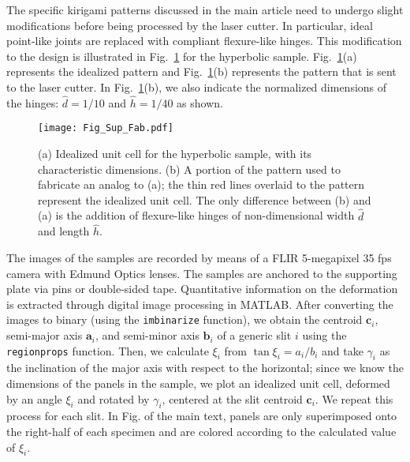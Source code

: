 \documentclass[aps,11pt,tightenlines,notitlepage,superscriptaddress,longbibliography,nofootinbib]{revtex4-1}
\begin{document}
The specific kirigami patterns discussed in the main article need to undergo slight modifications before being processed by the laser cutter. In particular, ideal point-like joints are replaced with compliant flexure-like hinges. This modification to the design is illustrated in Fig.~\ref{fig:Fab} for the hyperbolic sample. Fig.~\ref{fig:Fab}(a) represents the idealized pattern and Fig.~\ref{fig:Fab}(b) represents the pattern that is sent to the laser cutter.
In Fig.~\ref{fig:Fab}(b), we also indicate the normalized dimensions of the hinges: $\hat{d}=1/10$ and $\hat{h}=1/40$ as shown. %
%
\begin{figure}[h]
\centering
\texttt{[image: Fig\_Sup\_Fab.pdf]}
\caption{(a) Idealized unit cell for the hyperbolic sample, with its characteristic dimensions. (b) A portion of the pattern used to fabricate an analog to (a); the thin red lines overlaid to the pattern represent the idealized unit cell. The only difference between (b) and (a) is the addition of flexure-like hinges of non-dimensional width $\hat{d}$ and length $\hat{h}$.}
\label{fig:Fab}
\end{figure}
%

The images of the samples are recorded by means of a FLIR 5-megapixel 35 fps camera with Edmund Optics lenses. The samples are anchored to the supporting plate via pins or double-sided tape. Quantitative information on the deformation is extracted through digital image processing in MATLAB. After converting the images to binary (using the \verb+imbinarize+ function), we obtain the centroid $\textbf{c}_i$, semi-major axis $\textbf{a}_i$, and semi-minor axis $\textbf{b}_i$ of a generic slit $i$ using the \verb+regionprops+ function. Then, we calculate $\xi_i$ from $\tan{\xi_i}=a_i/b_i$ and take $\gamma_i$ as the inclination of the major axis with respect to the horizontal; since we know the dimensions of the panels in the sample, we plot an idealized unit cell, deformed by an angle $\xi_i$ and rotated by $\gamma_i$, centered at the slit centroid $\textbf{c}_i$. We repeat this process for each slit. In Fig. of the main text, panels are only superimposed onto the right-half of each specimen and are colored according to the calculated value of $\xi_i$.


% 

\end{document}
